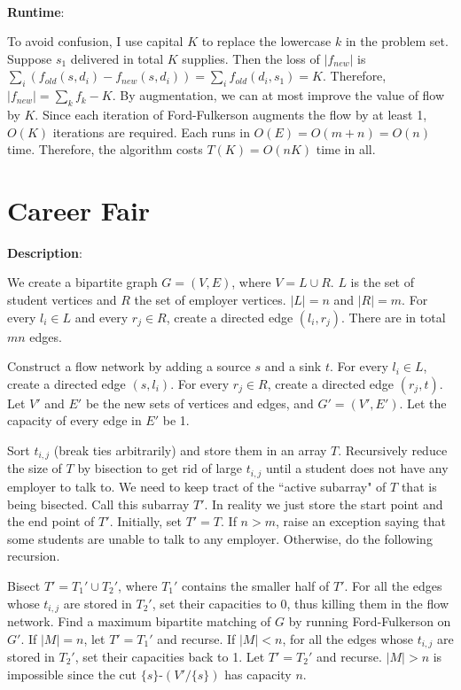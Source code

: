 \documentclass{article}
\begin{document}
~

\noindent\textbf{Runtime}:

To avoid confusion, I use capital $K$ to replace the lowercase $k$ in the problem set. Suppose $s_1$ delivered in total $K$ supplies. Then the loss of $|f_{new}|$ is $\sum_i(f_{old}(s,d_i)-f_{new}(s,d_i))=\sum_if_{old}(d_i,s_1)=K$. Therefore, $|f_{new}|=\sum_kf_k-K$. By augmentation, we can at most improve the value of flow by $K$. Since each iteration of Ford-Fulkerson augments the flow by at least 1, $O(K)$ iterations are required. Each runs in $O(E)=O(m+n)=O(n)$ time. Therefore, the algorithm costs $T(K)=O(nK)$ time in all.


\section{Career Fair}
\noindent\textbf{Description}:

We create a bipartite graph $G=(V,E)$, where $V=L\cup R$. $L$ is the set of student vertices and $R$ the set of employer vertices. $|L|=n$ and $|R|=m$. For every $l_i\in L$ and every $r_j\in R$, create a directed edge $(l_i,r_j)$. There are in total $mn$ edges.

Construct a flow network by adding a source $s$ and a sink $t$. For every $l_i\in L$, create a directed edge $(s,l_i)$. For every $r_j\in R$, create a directed edge $(r_j,t)$. Let $V'$ and $E'$ be the new sets of vertices and edges, and $G'=(V',E')$. Let the capacity of every edge in $E'$ be 1.

Sort $t_{i,j}$ (break ties arbitrarily) and store them in an array $T$. Recursively reduce the size of $T$ by bisection to get rid of large $t_{i,j}$ until a student does not have any employer to talk to. We need to keep tract of the ``active subarray" of $T$ that is being bisected. Call this subarray $T'$. In reality we just store the start point and the end point of $T'$. Initially, set $T'=T$. If $n>m$, raise an exception saying that some students are unable to talk to any employer. Otherwise, do the following recursion.

Bisect $T'=T_1'\cup T_2'$, where $T_1'$ contains the smaller half of $T'$. For all the edges whose $t_{i,j}$ are stored in $T_2'$, set their capacities to 0, thus killing them in the flow network. Find a maximum bipartite matching of $G$ by running Ford-Fulkerson on $G'$. If $|M|=n$, let $T'=T_1'$ and recurse. If $|M|<n$, for all the edges whose $t_{i,j}$ are stored in $T_2'$, set their capacities back to 1. Let $T'=T_2'$ and recurse. $|M|>n$ is impossible since the cut $\{s\}$-$(V'/\{s\})$ has capacity $n$.
\end{document}
